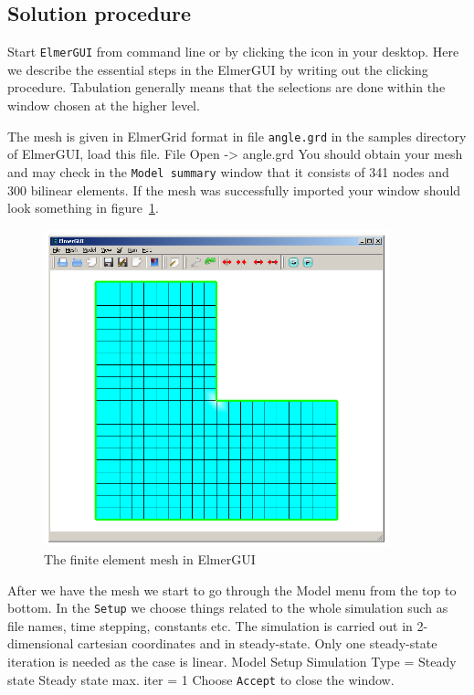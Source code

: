 \subsection*{Solution procedure}

Start \texttt{ElmerGUI} from command line or by clicking the icon in your desktop. Here we describe 
the essential steps in the ElmerGUI by writing out the clicking procedure. Tabulation generally means that the 
selections are done within the window chosen at the higher level. 

The mesh is given in ElmerGrid format in file \texttt{angle.grd} in the samples directory of ElmerGUI, 
load this file.
\ttbegin
File 
  Open -> angle.grd
\ttend
You should obtain your mesh and may check in the \texttt{Model summary} 
window that it consists of 341 nodes and 300 bilinear elements.
If the mesh was successfully imported your window should look something in figure~\ref{fg:mesh1}.

\begin{figure}
\begin{center}
\includegraphics[width=100mm]{Tangle_mesh}
\caption{The finite element mesh in ElmerGUI}\label{fg:mesh1}
\end{center}
\end{figure}

After we have the mesh we start to go through the Model menu from the top to bottom. 
In the \texttt{Setup} we choose things related to the whole simulation such as file names, 
time stepping, constants etc.
The simulation is carried out in 2-dimensional cartesian
coordinates and in steady-state. 
Only one steady-state iteration is needed as the case is linear. 
\ttbegin
Model
  Setup 
    Simulation Type = Steady state
    Steady state max. iter = 1
\ttend
Choose \texttt{Accept} to close the window.

